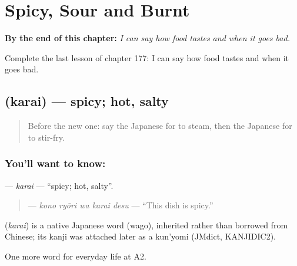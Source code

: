 
\chapter{Spicy, Sour and Burnt}
\label{ch:ja-spicy-sour-and-burnt}

\begin{chapteropening}
\textbf{By the end of this chapter:} \emph{I can say how food tastes and when it goes bad.}

Complete the last lesson of chapter 177: I can say how food tastes and when it goes bad.
\end{chapteropening}

\section[\texorpdfstring{\ja{からい} (karai)}{からい (karai)}]{ (karai) — spicy; hot, salty}

\label{lesson:JA-C177-karai}



\begin{quote}
Before the new one: say the Japanese for to steam, then the Japanese for to stir-fry.
\end{quote}

\subsection*{You'll want to know: }
\textbf{} — \emph{karai} — \textquotedblleft{}spicy; hot, salty\textquotedblright{}.

\begin{quote}
\textbf{  } — \emph{kono ryōri wa karai desu} — \textquotedblleft{}This dish is spicy.\textquotedblright{}
\end{quote}

\begin{cousinweb}
\textbf{} (\emph{karai}) is a native Japanese word (wago), inherited rather than borrowed from Chinese; its kanji was attached later as a kun'yomi (JMdict, KANJIDIC2).
\end{cousinweb}

\begin{grammarlens}[title={What you've built}]
One more word for everyday life at A2.
\end{grammarlens}

